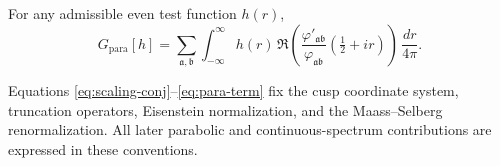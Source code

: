 For any admissible even test function $h(r)$,
\begin{equation}\label{eq:para-term}
G_{\mathrm{para}}[h]
=
\sum_{\mathfrak a,\mathfrak b}
\int_{-\infty}^{\infty}
h(r)\,
\Re\!\left(
\frac{\varphi'_{\mathfrak a\mathfrak b}}{\varphi_{\mathfrak a\mathfrak b}}
\!\left(\tfrac12+ir\right)
\right)\,
\frac{dr}{4\pi}.
\end{equation}

\begin{remark}[Audit]\label{rem:cusps-audit}
Equations \eqref{eq:scaling-conj}--\eqref{eq:para-term} fix the cusp coordinate system,
truncation operators, Eisenstein normalization, and the Maass--Selberg renormalization.
All later parabolic and continuous-spectrum contributions are expressed in these conventions.
\end{remark}
